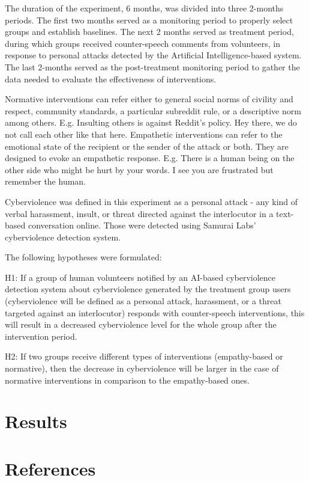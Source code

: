 \documentclass[
  10pt,
  dvipsnames,enabledeprecatedfontcommands]{scrartcl}
\begin{document}
The duration of the experiment, 6 months, was divided into three
2-months periods. The first two months served as a monitoring period to
properly select groups and establish baselines. The next 2 months served
as treatment period, during which groups received counter-speech
comments from volunteers, in response to personal attacks detected by
the Artificial Intelligence-based system. The last 2-months served as
the post-treatment monitoring period to gather the data needed to
evaluate the effectiveness of interventions.

Normative interventions can refer either to general social norms of
civility and respect, community standards, a particular subreddit rule,
or a descriptive norm among others. E.g. Insulting others is against
Reddit's policy. Hey there, we do not call each other like that here.
Empathetic interventions can refer to the emotional state of the
recipient or the sender of the attack or both. They are designed to
evoke an empathetic response. E.g. There is a human being on the other
side who might be hurt by your words. I see you are frustrated but
remember the human.

Cyberviolence was defined in this experiment as a personal attack - any
kind of verbal harassment, insult, or threat directed against the
interlocutor in a text-based conversation online. Those were detected
using Samurai Labs' cyberviolence detection system.

The following hypotheses were formulated:

H1: If a group of human volunteers notified by an AI-based cyberviolence
detection system about cyberviolence generated by the treatment group
users (cyberviolence will be defined as a personal attack, harassment,
or a threat targeted against an interlocutor) responds with
counter-speech interventions, this will result in a decreased
cyberviolence level for the whole group after the intervention period.

H2: If two groups receive different types of interventions
(empathy-based or normative), then the decrease in cyberviolence will be
larger in the case of normative interventions in comparison to the
empathy-based ones.

\hypertarget{results}{%
\section{Results}\label{results}}

\hypertarget{references}{%
\section*{References}\label{references}}
\end{document}
